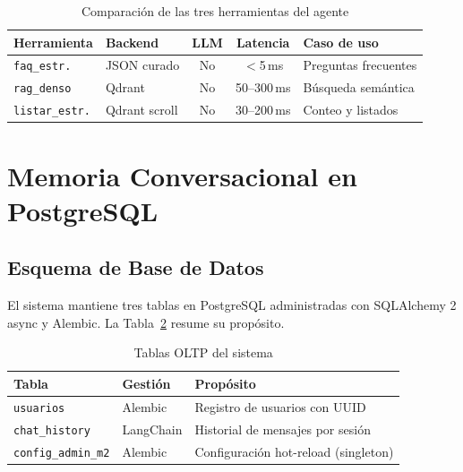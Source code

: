 \documentclass[conference]{IEEEtran}
\newcommand{\code}[1]{\texttt{\small #1}}
\begin{document}
\begin{table}[ht]
\centering
\caption{Comparación de las tres herramientas del agente}
\label{tab:tools}
\setlength{\tabcolsep}{3pt}
\footnotesize
\begin{tabular}{@{}llccp{1.5cm}@{}}
\toprule
\textbf{Herramienta} & \textbf{Backend} & \textbf{LLM} & \textbf{Latencia} & \textbf{Caso de uso} \\
\midrule
\code{faq\_estr.}          & JSON curado   & No & $<$5\,ms    & Preguntas frecuentes \\
\code{rag\_denso}          & Qdrant        & No & 50--300\,ms & Búsqueda semántica   \\
\code{listar\_estr.}       & Qdrant scroll & No & 30--200\,ms & Conteo y listados    \\
\bottomrule
\end{tabular}
\normalsize
\end{table}

\section{Memoria Conversacional en PostgreSQL}
\label{sec:memoria}

\subsection{Esquema de Base de Datos}

El sistema mantiene tres tablas en PostgreSQL administradas con SQLAlchemy 2
async y Alembic. La Tabla~\ref{tab:db} resume su propósito.

\begin{table}[ht]
\centering
\caption{Tablas OLTP del sistema}
\label{tab:db}
\setlength{\tabcolsep}{3pt}
\begin{tabular}{@{}lll@{}}
\toprule
\textbf{Tabla} & \textbf{Gestión} & \textbf{Propósito} \\
\midrule
\code{usuarios}        & Alembic   & Registro de usuarios con UUID \\
\code{chat\_history}   & LangChain & Historial de mensajes por sesión \\
\code{config\_admin\_m2} & Alembic & Configuración hot-reload (singleton) \\
\bottomrule
\end{tabular}
\end{table}
\end{document}
